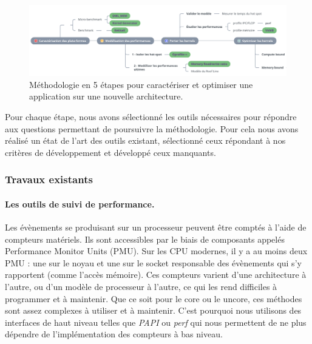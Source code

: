         \begin{figure}[h!]
        \center
        \includegraphics[width=16cm]{images/methodologie_step.png}
        \caption{\label{pic:methodologie_step_1} Méthodologie en 5 étapes pour caractériser et optimiser une application sur une nouvelle architecture.}
        \end{figure}
        
        Pour chaque étape, nous avons sélectionné les outils nécessaires pour répondre aux questions permettant de poursuivre la méthodologie. Pour cela nous avons réalisé un état de l'art des outils existant, sélectionné ceux répondant à nos critères de développement et développé ceux manquants.
        
        
   
    \subsubsection{Travaux existants}
    
        \paragraph{Les outils de suivi de performance.} Les évènements se produisant sur un processeur peuvent être comptés à l'aide de compteurs matériels. Ils sont accessibles par le biais de composants appelés Performance Monitor Units (PMU). Sur les CPU modernes, il y a au moins deux PMU : une sur le noyau et une sur le socket responsable des évènements qui s'y rapportent (comme l'accès mémoire). Ces compteurs varient d'une architecture à l'autre, ou d'un modèle de processeur à l'autre, ce qui les rend difficiles à programmer et à maintenir. Que ce soit pour le core ou le uncore, ces méthodes sont assez complexes à utiliser et à maintenir. C'est pourquoi nous utilisons des interfaces de haut niveau telles que \textit{PAPI} ou \textit{perf} qui nous permettent de ne plus dépendre de l'implémentation des compteurs à bas niveau. 
        
